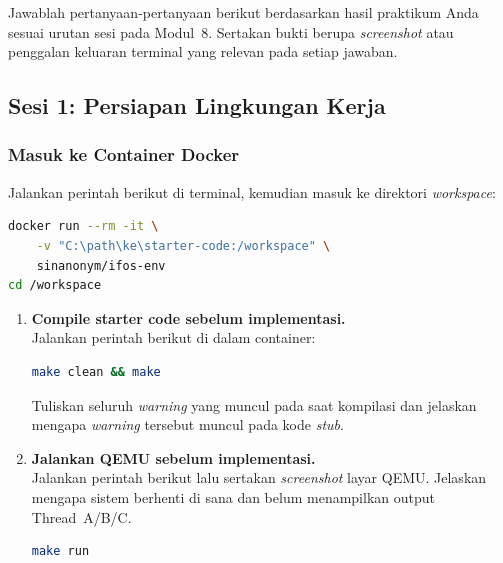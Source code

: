 Jawablah pertanyaan-pertanyaan berikut berdasarkan hasil praktikum Anda
sesuai urutan sesi pada Modul~8.
Sertakan bukti berupa \textit{screenshot} atau penggalan keluaran
terminal yang relevan pada setiap jawaban.

\subsection{Sesi 1: Persiapan Lingkungan Kerja}

\subsubsection{Masuk ke Container Docker}

Jalankan perintah berikut di terminal, kemudian masuk ke direktori
\textit{workspace}:

\begin{lstlisting}[language=bash, caption={Menjalankan container dan masuk workspace}]
docker run --rm -it \
    -v "C:\path\ke\starter-code:/workspace" \
    sinanonym/ifos-env
cd /workspace
\end{lstlisting}

\begin{enumerate}

	\item \textbf{Compile starter code sebelum implementasi.}\\
	      Jalankan perintah berikut di dalam container:

	      \begin{lstlisting}[language=bash, caption={Perintah kompilasi awal}]
make clean && make
    \end{lstlisting}

	      Tuliskan seluruh \textit{warning} yang muncul pada saat kompilasi dan
	      jelaskan mengapa \textit{warning} tersebut muncul pada kode
	      \textit{stub}.

	\item \textbf{Jalankan QEMU sebelum implementasi.}\\
	      Jalankan perintah berikut lalu sertakan \textit{screenshot} layar QEMU.
	      Jelaskan mengapa sistem berhenti di sana dan belum menampilkan
	      output Thread~A/B/C.

	      \begin{lstlisting}[language=bash, caption={Menjalankan emulator QEMU}]
make run
    \end{lstlisting}


\end{enumerate}

